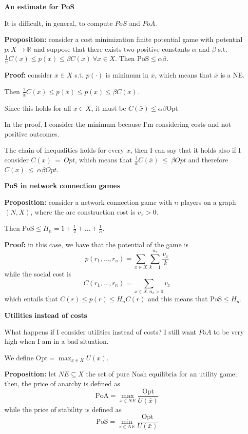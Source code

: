 \bigskip
\noindent \textbf{An estimate for PoS}

\noindent It is difficult, in general, to compute $PoS$ and $PoA$.

\bigskip
\noindent \textbf{Proposition:} consider a cost minimization finite potential game with potential $p: X \rightarrow \mathbb{R}$ and suppose that there exists two positive constants $\alpha$ and $\beta$ s.t. $\frac{1}{\alpha}C(x) \leq p(x) \leq \beta C(x) ~\forall x \in X$.
\noindent Then $\text{PoS} \leq \alpha \beta$.

\bigskip
\noindent \textbf{Proof:} consider $\bar{x} \in X$ s.t. $p(\cdot)$ is minimum in $\bar{x}$, which means that $\bar{x}$ is a NE.

\noindent Then $\frac{1}{\alpha}C(\bar{x}) \leq p(\bar{x}) \leq p(x) \leq \beta C(x)$.

\noindent Since this holds for all $x \in X$, it must be $C(\bar{x}) \leq \alpha \beta \text{Opt}$ 

\bigskip
\noindent In the proof, I consider the minimum because I'm considering 
costs and not positive outcomes.

\noindent The chain of inequalities holds for every $x$, then I can say 
that it holds also if I consider $C(x)~=~Opt$, which means that 
$\frac{1}{\alpha}C(\bar{x})~\leq~\beta Opt$ and therefore 
$C(\bar{x})~\leq~\alpha \beta Opt$.

\bigskip
\noindent \textbf{PoS in network connection games}

\bigskip
\noindent \textbf{Proposition:} consider a network connection game with $n$ players on a graph $(N,X)$, where the arc construction cost is $v_x > 0$.

\noindent Then $\text{PoS} \leq H_n = 1 + \frac{1}{2} + ... + \frac{1}{n}$.

\bigskip
\noindent \textbf{Proof:} in this case, we have that the potential of the game is
\[
	p(r_1,...,r_n) = \sum_{x \in X}{\sum_{k=1}^{n_x}{\frac{v_x}{k}}}
\]
while the social cost is
\[
	C(r_1,...,r_n) = \sum_{x \in X: n_x > 0}{v_x}
\]
which entails that $C(r) \leq p(r) \leq H_nC(r)$ and this means that 
$\text{PoS} \leq H_n$.

\bigskip
\noindent \textbf{Utilities instead of costs}

\noindent What happens if I consider utilities instead of costs? I still 
want $PoA$ to be very high when I am in a bad situation.

\noindent We define $\text{Opt} = \max_{x \in X}{U(x)}$.

\bigskip
\noindent \textbf{Proposition:} let $NE \subseteq X$ the set of pure Nash equilibria for an utility game; then, the price of anarchy is defined as
\[
	\text{PoA} = \max_{\bar{x} \in NE}{\frac{\text{Opt}}{U(\bar{x})}}
\]
while the price of stability is defined as
\[
\text{PoS} = \min_{\bar{x} \in NE}{\frac{\text{Opt}}{U(\bar{x})}}
\]

%

